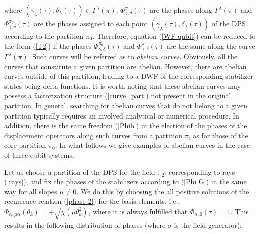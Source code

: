 \documentclass[quantumrep,article,submit,pdftex,moreauthors]{Definitions/mdpi}
\begin{document}
where $\left(\gamma_{\lambda}(\tau),\delta_{\lambda}(\tau)\right) \in
\Gamma^{\lambda}(\pi)$, $\Phi_{\gamma,\delta }^{\pi}(\tau)$ are the phases along
$\Gamma^{\lambda}(\pi)$ and $\Phi_{\gamma,\delta}^{\pi_{0}}(\tau)$ are the
phases assigned to each point
$\left(\gamma_{\lambda}(\tau),\delta_{\lambda}(\tau )\right)$ of the DPS
according to the partition $\pi_{0}$. Therefore, equation (\ref{WF qubit}) can
be reduced to the form (\ref{T2}) if the phases
$\Phi_{\gamma,\delta}^{\pi_{0}}(\tau)$ and $\Phi_{\gamma,\delta }^{\pi}(\tau)$
are the same along the curve $\Gamma^{\lambda}(\pi)$. Such curves will be
referred as to \textit{abelian curves}. Obviously, all the curves that
constitute a given partition are abelian. However, there are abelian curves
outside of this partition, leading to a DWF of the corresponding stabilizer
states being delta-functions.  It is worth noting that these abelian curves may
possess a factorization structure (\ref{curve_part}) not present in the original
partition. In general, searching for abelian curves that do not belong to a
given partition typically requires an involved analytical or numerical
procedure.  In addition, there is the same freedom (\ref{Phib}) in the election
of the phases of the displacement operators along such curves from a partition
$\pi$, as for those of the core partition $\pi_{0}$. In what follows we give
examples of abelian curves in the case of three qubit systems.

Let us choose a partition of the DPS for the field $\mathbb{F}_{2^{3}}$
corresponding to rays (\ref{rays}), and fix the phases of the stabilizers
according to (\ref{Phi G}) in the same way for all slopes $\mu \neq 0$. We do
this by choosing the all positive solutions of the recurrence relation
(\ref{phase 2}) for the basis elements, i.e.,
$\Phi_{\alpha,\mu\alpha}(\theta_{k}) =
+\sqrt{\chi\left(\mu\theta_{k}^{2}\right)}$, where it is always fulfilled that
$\Phi_{\alpha,0}(\tau) = 1$. This results in the following distribution of
phases (where $\sigma$ is the field generator): 
\end{document}
